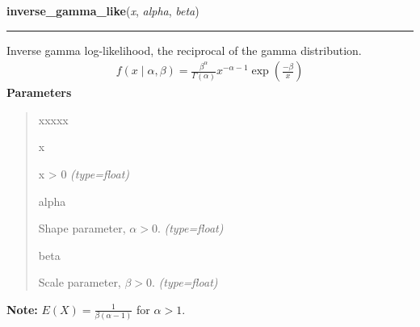     \vspace{0.5ex}

\hspace{.8\funcindent}\begin{boxedminipage}{\funcwidth}

    \raggedright \textbf{inverse\_gamma\_like}(\textit{x}, \textit{alpha}, \textit{beta})

    \vspace{-1.5ex}

    \rule{\textwidth}{1pt}
\setlength{\parskip}{2ex}

Inverse gamma log-likelihood, the reciprocal of the gamma distribution.
\begin{equation*}\begin{split}f(x \mid \alpha, \beta) = \frac{\beta^{\alpha}}{\Gamma(\alpha)} x^{-\alpha - 1} \exp\left(\frac{-\beta}{x}\right)\end{split}\end{equation*}\setlength{\parskip}{1ex}
      \textbf{Parameters}
      \vspace{-1ex}

      \begin{quote}
        \begin{Ventry}{xxxxx}

          \item[x]


x {\textgreater} 0
            {\it (type=float)}

          \item[alpha]


Shape parameter, $\alpha > 0$.
            {\it (type=float)}

          \item[beta]


Scale parameter, $\beta > 0$.
            {\it (type=float)}

        \end{Ventry}

      \end{quote}

\textbf{Note:} 
$E(X)=\frac{1}{\beta(\alpha-1)}$  for $\alpha > 1$.


    \end{boxedminipage}

    \label{pymc:distributions:lognormal_like}

    \vspace{0.5ex}

